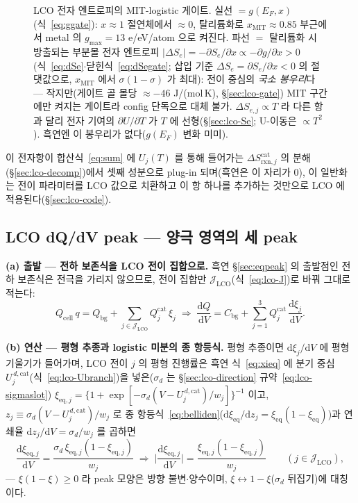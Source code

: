 \documentclass[11pt,a4paper]{article}
\newcommand{\dd}{\mathrm{d}}
\newcommand{\eq}{\mathrm{eq}}
\newcommand{\cell}{\mathrm{cell}}
\newcommand{\bg}{\mathrm{bg}}
\newcommand{\rxn}{\mathrm{rxn}}
\begin{document}
\begin{figure}[t]
\caption{LCO 전자 엔트로피의 MIT-logistic 게이트. 실선 $=g(E_F,x)$(식~\eqref{eq:ggate}): $x\!\approx\!1$
절연체에서 $\approx0$, 탈리튬화로 $x_\mathrm{MIT}\!\approx\!0.85$ 부근에서 metal 의 $g_{\max}\!=\!13$ e/eV/atom 으로 켜진다.
파선 $=$ 탈리튬화 시 방출되는 부분몰 전자 엔트로피 $|\Delta S_e|=-\partial S_e/\partial x\propto-\partial g/\partial x>0$
(식~\eqref{eq:dSe}$\cdot$닫힌식~\eqref{eq:dSegate}; 삽입 기준 $\Delta S_e=\partial S_e/\partial x<0$ 의 절댓값으로,
$x_\mathrm{MIT}$ 에서 $\sigma(1-\sigma)$ 가 최대): 전이 중심의 \emph{국소
봉우리}다 — 작지만(게이트 골 몰당 $\approx-46$ J/(mol\,K), \S\ref{sec:lco-gate}) MIT 구간에만 켜지는 게이트라 config 단독으로 대체 불가.
$\Delta S_{e,j}\propto T$ 라 다른 항과 달리 전자 기여의 $\partial U/\partial T$ 가 $T$ 에 선형(\S\ref{sec:lco-Se}; U-이동은
$\propto T^2$). 흑연엔 이 봉우리가 없다($g(E_F)$ 변화 미미).}
\label{fig:lco-electronic}
\end{figure}

이 전자항이 합산식~\eqref{eq:sum} 에 $U_j(T)$ 를 통해 들어가는 $\Delta S_{\rxn,j}^\mathrm{cat}$ 의 분해
(\S\ref{sec:lco-decomp})에서 셋째 성분으로 plug-in 되며(흑연은 이 자리가 0),
이 일반화는 전이 파라미터를 LCO 값으로 치환하고 이 항 하나를 추가하는 것만으로 LCO 에 적용된다(\S\ref{sec:lco-code}).

\subsection{LCO dQ/dV peak — 양극 영역의 세 peak}\label{sec:lco-peak}
\textbf{(a) 출발 — 전하 보존식을 LCO 전이 집합으로.} 흑연 \S\ref{sec:eqpeak} 의 출발점인 전하 보존식은
전극을 가리지 않으므로, 전이 집합만 $\mathcal J_\mathrm{LCO}$(식~\eqref{eq:lco-J})로 바꿔 그대로 적는다:
\begin{equation}
Q_\cell\,q=Q_\bg+\sum_{j\in\mathcal J_\mathrm{LCO}}Q_j^\mathrm{cat}\,\xi_j
\;\Longrightarrow\;
\frac{\dd Q}{\dd V}=C_\bg+\sum_{j=1}^{3}Q_j^\mathrm{cat}\,\frac{\dd\xi_j}{\dd V}.
\label{eq:lco-charge}
\end{equation}

\textbf{(b) 연산 — 평형 추종과 logistic 미분의 종 항등식.} 평형 추종이면 $\dd\xi_j/\dd V$ 에 평형 기울기가 들어가며, LCO 전이 $j$ 의 평형 진행률은 흑연 식~\eqref{eq:xieq}
에 분기 중심 $U_j^{\,d,\mathrm{cat}}$(식~\eqref{eq:lco-Ubranch})을 넣은($\sigma_d$ 는 \S\ref{sec:lco-direction} 규약~\eqref{eq:lco-sigmaslot})
$\xi_{\eq,j}=\{1+\exp[-\sigma_d(V-U_j^{\,d,\mathrm{cat}})/w_j]\}^{-1}$ 이고, $z_j\equiv\sigma_d(V-U_j^{\,d,
\mathrm{cat}})/w_j$ 로 종 항등식~\eqref{eq:belliden}($\dd\xi_\eq/\dd z_j=\xi_\eq(1-\xi_\eq)$)과 연쇄율
$\dd z_j/\dd V=\sigma_d/w_j$ 를 곱하면
\begin{equation}
\frac{\dd\xi_{\eq,j}}{\dd V}=\frac{\sigma_d\,\xi_{\eq,j}(1-\xi_{\eq,j})}{w_j}
\;\Longrightarrow\;
\Big|\frac{\dd\xi_{\eq,j}}{\dd V}\Big|=\frac{\xi_{\eq,j}(1-\xi_{\eq,j})}{w_j}
\qquad(j\in\mathcal J_\mathrm{LCO}),
\label{eq:lco-belliden}
\end{equation}
— $\xi(1-\xi)\ge0$ 라 peak 모양은 방향 불변$\cdot$양수이며, $\xi\leftrightarrow1-\xi$($\sigma_d$ 뒤집기)에
대칭이다.
\end{document}
